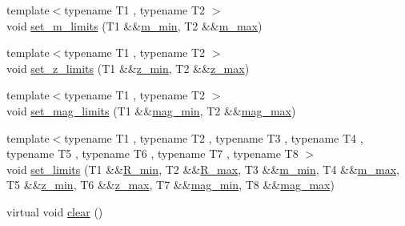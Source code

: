 \begin{DoxyCompactItemize}
\item 
{\footnotesize template$<$typename T1 , typename T2 $>$ }\\void \hyperlink{classIceBRG_1_1pair__bin__summary_ac7c7f0aaa8f116d0fe1209b7c5ff6559}{set\+\_\+m\+\_\+limits} (T1 \&\&\hyperlink{classIceBRG_1_1pair__bin__summary_a3d298870839005a013bbb03a51a9b596}{m\+\_\+min}, T2 \&\&\hyperlink{classIceBRG_1_1pair__bin__summary_a385862dcbf0238834d8638a9e79c37fd}{m\+\_\+max})
\item 
{\footnotesize template$<$typename T1 , typename T2 $>$ }\\void \hyperlink{classIceBRG_1_1pair__bin__summary_a218aceacdec198c9c6a1b82df250a931}{set\+\_\+z\+\_\+limits} (T1 \&\&\hyperlink{classIceBRG_1_1pair__bin__summary_aba3930b9f685f44653899d6087217530}{z\+\_\+min}, T2 \&\&\hyperlink{classIceBRG_1_1pair__bin__summary_adcc3f2b945ea7b0bef4aa3542ee230cd}{z\+\_\+max})
\item 
{\footnotesize template$<$typename T1 , typename T2 $>$ }\\void \hyperlink{classIceBRG_1_1pair__bin__summary_a681194896012615153d53eb521d93126}{set\+\_\+mag\+\_\+limits} (T1 \&\&\hyperlink{classIceBRG_1_1pair__bin__summary_a40cc6096a80b23659359b0a58f10cae2}{mag\+\_\+min}, T2 \&\&\hyperlink{classIceBRG_1_1pair__bin__summary_a9a13a840877d52c2eb0387e3ca7f9a70}{mag\+\_\+max})
\item 
{\footnotesize template$<$typename T1 , typename T2 , typename T3 , typename T4 , typename T5 , typename T6 , typename T7 , typename T8 $>$ }\\void \hyperlink{classIceBRG_1_1pair__bin__summary_ab0f435851f15bcd9ac594181be365c01}{set\+\_\+limits} (T1 \&\&\hyperlink{classIceBRG_1_1pair__bin__summary_af1ee4f7eeb70c23843a0ad4af2f41ef9}{R\+\_\+min}, T2 \&\&\hyperlink{classIceBRG_1_1pair__bin__summary_a26bb6d459f592d9ff9f4a11255d5884b}{R\+\_\+max}, T3 \&\&\hyperlink{classIceBRG_1_1pair__bin__summary_a3d298870839005a013bbb03a51a9b596}{m\+\_\+min}, T4 \&\&\hyperlink{classIceBRG_1_1pair__bin__summary_a385862dcbf0238834d8638a9e79c37fd}{m\+\_\+max}, T5 \&\&\hyperlink{classIceBRG_1_1pair__bin__summary_aba3930b9f685f44653899d6087217530}{z\+\_\+min}, T6 \&\&\hyperlink{classIceBRG_1_1pair__bin__summary_adcc3f2b945ea7b0bef4aa3542ee230cd}{z\+\_\+max}, T7 \&\&\hyperlink{classIceBRG_1_1pair__bin__summary_a40cc6096a80b23659359b0a58f10cae2}{mag\+\_\+min}, T8 \&\&\hyperlink{classIceBRG_1_1pair__bin__summary_a9a13a840877d52c2eb0387e3ca7f9a70}{mag\+\_\+max})
\item 
virtual void \hyperlink{classIceBRG_1_1pair__bin__summary_a916bb85a5a7b6be8ec21305beddcb966}{clear} ()

\end{DoxyCompactItemize}
